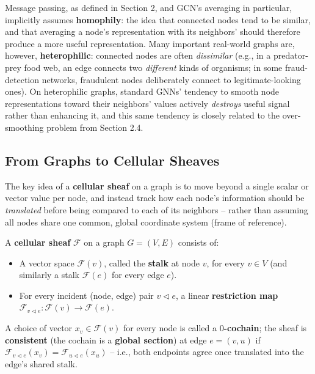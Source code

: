 \documentclass[12pt,a4paper]{article}
\begin{document}
\begin{keyidea}
Message passing, as defined in Section 2, and GCN's averaging in particular, implicitly assumes \textbf{homophily}: the idea that connected nodes tend to be similar, and that averaging a node's representation with its neighbors' should therefore produce a more useful representation. Many important real-world graphs are, however, \textbf{heterophilic}: connected nodes are often \emph{dissimilar} (e.g., in a predator-prey food web, an edge connects two \emph{different} kinds of organisms; in some fraud-detection networks, fraudulent nodes deliberately connect to legitimate-looking ones). On heterophilic graphs, standard GNNs' tendency to smooth node representations toward their neighbors' values actively \emph{destroys} useful signal rather than enhancing it, and this same tendency is closely related to the over-smoothing problem from Section 2.4.
\end{keyidea}

\subsection{From Graphs to Cellular Sheaves}

The key idea of a \textbf{cellular sheaf} on a graph is to move beyond a single scalar or vector value per node, and instead track how each node's information should be \emph{translated} before being compared to each of its neighbors -- rather than assuming all nodes share one common, global coordinate system (frame of reference).

\begin{defbox}
A \textbf{cellular sheaf} $\mathcal{F}$ on a graph $G=(V,E)$ consists of:
\begin{itemize}[leftmargin=1.5em]
    \item A vector space $\mathcal{F}(v)$, called the \textbf{stalk} at node $v$, for every $v \in V$ (and similarly a stalk $\mathcal{F}(e)$ for every edge $e$).
    \item For every incident (node, edge) pair $v \triangleleft e$, a linear \textbf{restriction map} $\mathcal{F}_{v \triangleleft e}: \mathcal{F}(v) \to \mathcal{F}(e)$.
\end{itemize}
A choice of vector $x_v \in \mathcal{F}(v)$ for every node is called a \textbf{$0$-cochain}; the sheaf is \textbf{consistent} (the cochain is a \textbf{global section}) at edge $e = (v,u)$ if $\mathcal{F}_{v \triangleleft e}(x_v) = \mathcal{F}_{u \triangleleft e}(x_u)$ -- i.e., both endpoints agree once translated into the edge's shared stalk.
\end{defbox}
\end{document}
